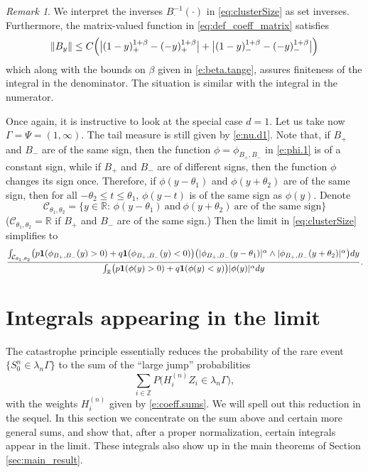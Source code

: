 \documentclass[11pt,reqno]{amsart}
\numberwithin{equation}{section}
\newcommand{\problem}[1]{{\color{red}  {Problems: #1}}}
\theoremstyle{definition}
\theoremstyle{remark}
\newtheorem{remark}{Remark}[section]
\theoremstyle{definition}
\newcommand{\R}{\mathbb{R}}
\newcommand{\ZZ}{\mathbb{Z}}
\newcommand{\one}{{\bf 1}}
\begin{document}
\begin{remark}
We interpret the inverses $B_\cdot^{-1}(\cdot)$ 
in \eqref{eq:clusterSize} as set inverses. Furthermore, the
matrix-valued function in \eqref{eq:def_coeff_matrix} satisfies
$$
\|B_y\|\leq C \Bigl(\big|(1-y)_+^{1+\beta} - (-y)_+^{1+\beta}\big|
+\big|(1-y)_-^{1+\beta} - (-y)_-^{1+\beta}\big|\Bigr)
$$
which along with the bounds on $\beta$ given in \eqref{e:beta.tange},
assures finiteness of the integral in the denominator. The situation
is similar with the integral in the numerator. 

Once again, it is instructive to look at the special case $d=1$. Let
us take now $\Gamma=\Psi = (1,\infty)$. The tail measure is still
given by \eqref{e:nu.d1}. Note that, if $B_+$ and $B_-$ are of the
same sign, then the function $\phi=\phi_{B_+,B_-}$ in \eqref{e:phi.1} is of a
constant sign, while if $B_+$ and $B_-$ are of different signs,  then
the function $\phi$ changes its sign once. Therefore, if
$\phi(y-\theta_1)$ and $\phi(y+\theta_2)$ are of the same sign, then
for all $-\theta_2\leq t\leq \theta_1$, $\phi(y-t)$ is of the same
sign as $\phi(y)$. Denote
$$
{\mathcal C}_{\theta_1,\theta_2}=\{ y\in\R:\, \phi(y-\theta_1) \
\text{and} \ \phi(y+\theta_2) \ \text{are of the same sign}\}
$$
(${\mathcal C}_{\theta_1,\theta_2}=\R$ if $B_+$ and $B_-$ are of the
same sign.) Then the limit in \eqref{eq:clusterSize} simplifies to 
\[ 
\frac{\int_{{\mathcal C}_{\theta_1,\theta_2}}\bigl(
  p\one(\phi_{B_+,B_-}(y)>0)+q\one(\phi_{B_+,B_-}(y)<0)\bigr) \bigl(
  |\phi_{B_+,B_-}(y-\theta_1)|^\alpha \wedge |\phi_{B_+,B_-}(y+\theta_2)|^\alpha\bigr)
   dy}
{\int_\R \bigl(
  p\one(\phi(y)>0)+q\one(\phi(y)<y)\bigr)|\phi(y)|^\alpha dy}. 
       \]



\end{remark}

\section{Integrals appearing in the
  limit}\label{sec:prop_1_int_approx}

The catastrophe principle essentially reduces the probability of the 
rare event \( \{S_0^{n}\in \lambda_n\Gamma\} \) to the sum of the
``large jump'' probabilities 
\[
\sum_{i\in\ZZ} P \big(H_i^{(n)}Z_i \in \lambda_n \Gamma\big),
\]
with the weights \(H_i^{(n)}\) given by \eqref{e:coeff.sums}. We will
spell out this reduction in the sequel. In this section we concentrate
on the sum above and certain more general sums, 
and show that, after a proper normalization, certain
integrals appear in the limit. These integrals also show up in the
main theorems of Section \ref{sec:main_result}.
\end{document}

